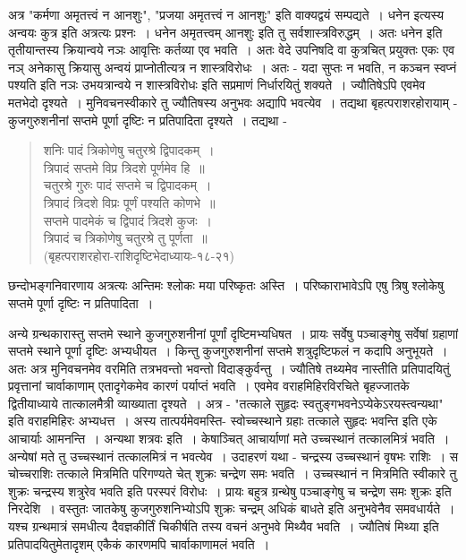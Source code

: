 {अत्र "कर्मणा अमृतत्त्वं न आनशुः", "प्रजया अमृतत्त्वं न आनशुः" इति वाक्यद्वयं सम्पद्यते~। धनेन इत्यस्य अन्वयः कुत्र इति अत्रत्यः प्रश्नः~। धनेन अमृतत्त्वम् आनशुः इति तु सर्वशास्त्रविरुद्धम्~। अतः धनेन इति तृतीयान्तस्य क्रियान्वये नञः आवृत्तिः कर्तव्या एव भवति~। अतः वेदे उपनिषदि वा कुत्रचित् प्रयुक्तः एकः एव नञ् अनेकासु क्रियासु अन्वयं प्राप्नोतीत्यत्र न शास्त्रविरोधः~। अतः - यदा सुप्तः न भवति, न कञ्चन स्वप्नं पश्यति इति नञः उभयत्रान्वये न शास्त्रविरोधः इति सप्रमाणं निर्धारयितुं शक्यते~। ज्यौतिषेऽपि एवमेव मतभेदो दृश्यते~। मुनिवचनस्वीकारे तु ज्यौतिषस्य अनुभवः अद्यापि भवत्येव~। तद्यथा बृहत्पराशरहोरायाम् - कुजगुरुशनीनां सप्तमे पूर्णा दृष्टिः न प्रतिपादिता दृश्यते~। तद्यथा -
\begin{verse}
शनिः पादं त्रिकोणेषु चतुरश्रे द्विपादकम्~। \\
त्रिपादं सप्तमे विप्र त्रिदशे पूर्णमेव हि~॥\\
चतुरश्रे गुरुः पादं सप्तमे च द्विपादकम्~। \\
त्रिपादं त्रिदशे विप्रः पूर्णं पश्यति कोणभे~॥\\
सप्तमे पादमेकं च द्विपादं त्रिदशे कुजः~। \\
त्रिपादं च त्रिकोणेषु चतुरश्रे तु पूर्णता~॥\\
\hspace{3cm} (बृहत्पराशरहोरा-राशिदृष्टिभेदाध्यायः-१८-२१)
\end{verse}
छन्दोभङ्गनिवारणाय अत्रत्यः अन्तिमः श्लोकः मया परिष्कृतः अस्ति~। परिष्काराभावेऽपि एषु त्रिषु श्लोकेषु सप्तमे पूर्णा दृष्टिः न प्रतिपादिता~।  

अन्ये ग्रन्थकारास्तु सप्तमे स्थाने कुजगुरुशनीनां पूर्णां दृष्टिमभ्यधिषत~। प्रायः सर्वेषु पञ्चाङ्गेषु सर्वेषां ग्रहाणां सप्तमे स्थाने पूर्णा दृष्टिः अभ्यधीयत~। किन्तु कुजगुरुशनीनां सप्तमे शत्रुदृष्टिफलं न कदापि अनुभूयते~। अतः अत्र मुनिवचनमेव वरमिति तत्रभवन्तो भवन्तो विदाङ्कुर्वन्तु~। ज्यौतिषे तथ्यमेव नास्तीति प्रतिपादयितुं प्रवृत्तानां चार्वाकाणाम् एतादृगेकमेव कारणं पर्याप्तं भवति~। एवमेव वराहमिहिरविरचिते बृहज्जातके द्वितीयाध्याये तात्कालमैत्री व्याख्याता दृश्यते~। अत्र - "तत्काले सुहृदः स्वतुङ्गभवनेऽप्येकेऽरयस्त्वन्यथा" इति वराहमिहिरः अभ्यधत्त~। अस्य तात्पर्यमेवमस्ति- स्वोच्चस्थाने ग्रहाः तत्काले  सुहृदः भवन्ति इति एके आचार्याः आमनन्ति~। अन्यथा शत्रवः इति~। केषाञ्चित् आचार्याणां मते उच्चस्थानं तत्कालमित्रं भवति~। अन्येषां मते तु उच्चस्थानं तत्कालमित्रं न भवत्येव~। उदाहरणं यथा - चन्द्रस्य उच्चस्थानं वृषभः राशिः~। स चोच्चराशिः तत्काले मित्रमिति परिगण्यते चेत् शुक्रः चन्द्रेण समः भवति~। उच्चस्थानं न मित्रमिति स्वीकारे तु शुक्रः चन्द्रस्य शत्रुरेव भवति इति परस्परं विरोधः~। प्रायः बहुत्र ग्रन्थेषु पञ्चाङ्गेषु च चन्द्रेण समः शुक्रः इति निरदेशि~। वस्तुतः जातकेषु कुजगुरुशनिभ्योऽपि शुक्रः चन्द्रम् अधिकं बाधते इति अनुभवेनैव समवधार्यते~। यश्च ग्रन्थमात्रं समधीत्य दैवज्ञकीर्तिं चिकीर्षति तस्य वचनं अनुभवे मिथ्यैव भवति~। ज्यौतिषं मिथ्या इति प्रतिपादयितुमेतादृशम् एकैकं कारणमपि चार्वाकाणामलं भवति~। 

}
